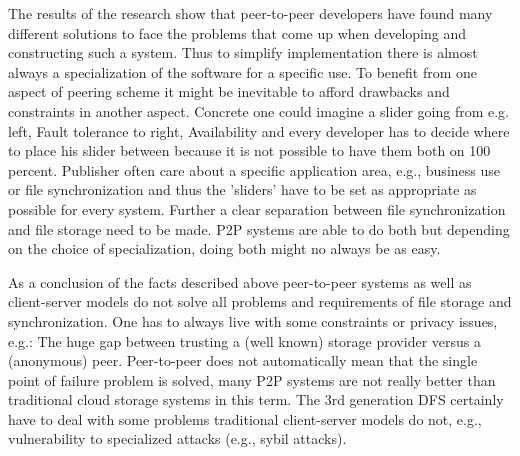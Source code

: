 The results of the research show that peer-to-peer developers have found many different solutions to face the problems that come up when developing and constructing such a system. Thus to simplify implementation there is almost always a specialization of the software for a specific use. To benefit from one aspect of peering scheme it might be inevitable to afford drawbacks and constraints in another aspect. Concrete one could imagine a slider going from e.g. left, Fault tolerance to right, Availability and every developer has to decide where to place his slider between because it is not possible to have them both on 100 percent. Publisher often care about a specific application area, e.g., business use or file synchronization and thus the 'sliders' have to be set as appropriate as possible for every system. Further a clear separation between file synchronization and file storage need to be made. P2P systems are able to do both but depending on the choice of specialization, doing both might no always be as easy.

As a conclusion of the facts described above peer-to-peer systems as well as client-server models do not solve all problems and requirements of file storage and synchronization. One has to always live with some constraints or privacy issues, e.g.: The huge gap between trusting a (well known) storage provider versus a (anonymous) peer. Peer-to-peer does not automatically mean that the single point of failure problem is solved, many P2P systems are not really better than traditional cloud storage systems in this term. The 3rd generation DFS certainly have to deal with some problems traditional client-server models do not, e.g., vulnerability to specialized attacks (e.g., sybil attacks).

